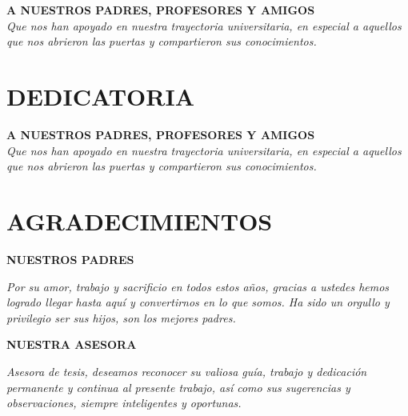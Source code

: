 
\chapter*{}
\thispagestyle{empty}
\begin{flushright}
	\vfill
	\textbf{A NUESTROS PADRES, PROFESORES Y AMIGOS}\\
	\textit{Que nos han apoyado en nuestra trayectoria universitaria, en especial a aquellos\\ que nos abrieron las puertas y compartieron sus conocimientos.}
	\vfill
\end{flushright}

\chapter*{DEDICATORIA}
\thispagestyle{empty}

	\begin{flushright}
	\vfill
	\textbf{A NUESTROS PADRES, PROFESORES Y AMIGOS}\\
	\textit{Que nos han apoyado en nuestra trayectoria universitaria, en especial a aquellos\\ que nos abrieron las puertas y compartieron sus conocimientos.}
	\vfill
\end{flushright}

\chapter*{AGRADECIMIENTOS}
\thispagestyle{empty}
\vfill
{\flushright \textbf{NUESTROS PADRES}\\}

\textit{Por su amor, trabajo y sacrificio en todos estos años, gracias a ustedes hemos logrado llegar hasta aquí y convertirnos en lo que somos. Ha sido un orgullo y privilegio ser sus hijos, son los mejores padres.}
\newline

{\flushright \textbf{NUESTRA ASESORA\\}}

\textit{Asesora de tesis, deseamos reconocer su valiosa guía, trabajo y dedicación permanente y continua al presente trabajo, así como sus sugerencias y observaciones, siempre inteligentes y oportunas.}
\newline

